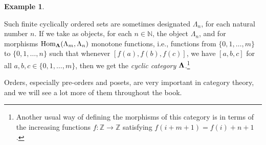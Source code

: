 \documentclass[a4paper]{book}
\theoremstyle{definition}
\newtheorem{example}{Example}[section]
\theoremstyle{definition}
\theoremstyle{definition}
\theoremstyle{theorem}
\theoremstyle{definition}
\begin{document}
\begin{example}
\begin{center}
	\end{center} 
	Such finite cyclically ordered sets are sometimes designated $\Lambda_n$, for each natural number $n$. If we take as objects, for each $n \in \mathbb{N}$, the object $\Lambda_n$, and for morphisms $\text{Hom}_{\bf{\Lambda}}(\Lambda_m, \Lambda_n)$ monotone functions, i.e., functions from $\{0,1,\dots, m\}$ to $\{0,1,\dots, n\}$ such that whenever $[f(a), f(b), f(c)]$, we have $[a,b,c]$ for all $a,b,c \in \{0,1,\dots, m\}$, then we get the \textit{cyclic category}  $\bf{\Lambda}$.\footnote{Another usual way of defining the morphisms of this category is in terms of the increasing functions $f: \mathbb{Z} \rightarrow \mathbb{Z}$ satisfying $f(i + m + 1) = f(i) + n + 1$.} \par 
	Orders, especially pre-orders and posets, are very important in category theory, and we will see a lot more of them throughout the book. 
\end{example}
\end{document}
